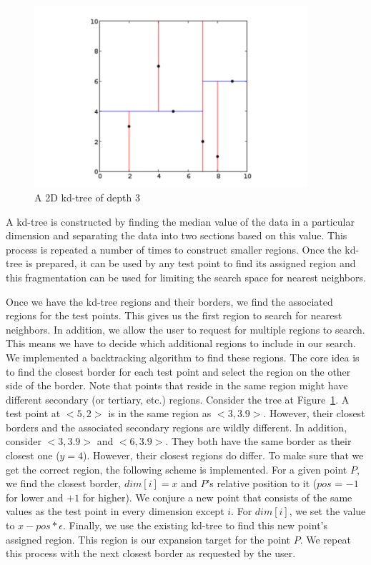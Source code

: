 \begin{figure}[h]
	\centering
	\includegraphics[width=0.9\textwidth]{figures/2d_kdtree.pdf}
\caption{A 2D kd-tree of depth 3}
\label{kdd:2d_kdtree}
\end{figure}

A kd-tree is constructed by finding the median value of the data in a
particular dimension and separating the data into two sections based on this
value. This process is repeated a number of times to construct smaller
regions. Once the kd-tree is prepared, it can be used by any test point to
find its assigned region and this fragmentation can be used for limiting the
search space for nearest neighbors.

Once we have the kd-tree regions and their borders, we find the associated
regions for the test points. This gives us the first region to search for
nearest neighbors. In addition, we allow the user to request for multiple
regions to search. This means we have to decide which additional regions to
include in our search. We implemented a backtracking algorithm to find these
regions. The core idea is to find the closest border for each test point and
select the region on the other side of the border. Note that points that
reside in the same region might have different secondary (or tertiary, etc.)
regions. Consider the tree at Figure~\ref{kdd:2d_kdtree}. A test point at $<5
, 2>$ is in the same region as $<3 , 3.9>$. However, their closest borders and
the associated secondary regions are wildly different. In addition, consider
$<3 , 3.9>$ and $<6 , 3.9>$. They both have the same border as their closest
one ($y=4$). However, their closest regions do differ. To make sure that we
get the correct region, the following scheme is implemented. For a given point
$P$, we find the closest border, $dim[i] = x$ and $P$'s relative position to
it ($pos$ = $-1$ for lower and $+1$ for higher). We conjure a new point that
consists of the same values as the test point in every dimension except $i$.
For $dim[i]$, we set the value to $x-pos*\epsilon$. Finally, we use the
existing kd-tree to find this new point's assigned region. This region is our
expansion target for the point $P$. We repeat this process with the next
closest border as requested by the user.

